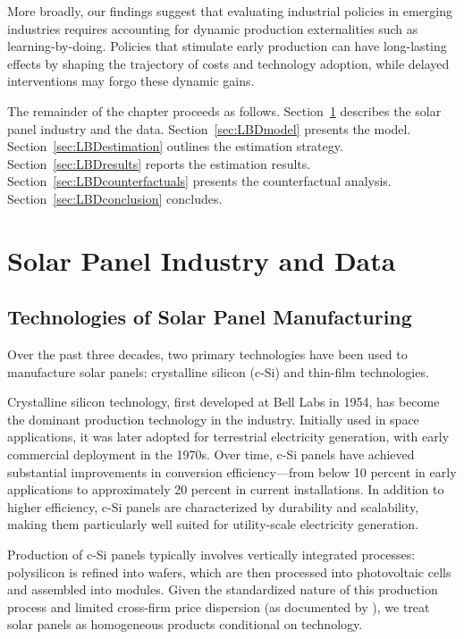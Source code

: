 \documentclass[12pt]{article}
\begin{document}
More broadly, our findings suggest that evaluating industrial policies in emerging industries requires accounting for dynamic production externalities such as learning-by-doing. Policies that stimulate early production can have long-lasting effects by shaping the trajectory of costs and technology adoption, while delayed interventions may forgo these dynamic gains.

The remainder of the chapter proceeds as follows. Section~\ref{sec:institution_data} describes the solar panel industry and the data. Section~\ref{sec:LBDmodel} presents the model. Section~\ref{sec:LBDestimation} outlines the estimation strategy. Section~\ref{sec:LBDresults} reports the estimation results. Section~\ref{sec:LBDcounterfactuals} presents the counterfactual analysis. Section~\ref{sec:LBDconclusion} concludes.




\section{Solar Panel Industry and Data}
\label{sec:institution_data}

\subsection{Technologies of Solar Panel Manufacturing}
\label{subsec:inst_PV_tech}
Over the past three decades, two primary technologies have been used to manufacture solar panels: crystalline silicon (c-Si) and thin-film technologies.

Crystalline silicon technology, first developed at Bell Labs in 1954, has become the dominant production technology in the industry. Initially used in space applications, it was later adopted for terrestrial electricity generation, with early commercial deployment in the 1970s. Over time, c-Si panels have achieved substantial improvements in conversion efficiency—from below 10 percent in early applications to approximately 20 percent in current installations. In addition to higher efficiency, c-Si panels are characterized by durability and scalability, making them particularly well suited for utility-scale electricity generation.

Production of c-Si panels typically involves vertically integrated processes: polysilicon is refined into wafers, which are then processed into photovoltaic cells and assembled into modules. Given the standardized nature of this production process and limited cross-firm price dispersion (as documented by \citet{bollinger2025strategic}), we treat solar panels as homogeneous products conditional on technology.
\end{document}
